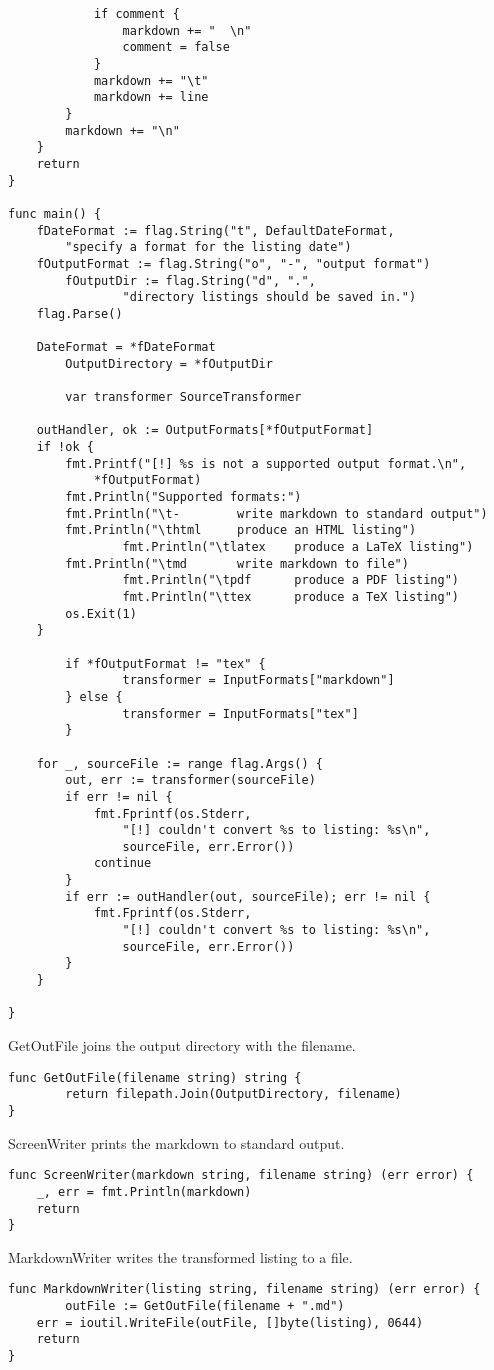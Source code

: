 \documentclass[11pt]{article}
\begin{document}
\begin{verbatim}
			if comment {
				markdown += "  \n"
				comment = false
			}
			markdown += "\t"
			markdown += line
		}
		markdown += "\n"
	}
	return
}

func main() {
	fDateFormat := flag.String("t", DefaultDateFormat,
		"specify a format for the listing date")
	fOutputFormat := flag.String("o", "-", "output format")
        fOutputDir := flag.String("d", ".",
                "directory listings should be saved in.")
	flag.Parse()

	DateFormat = *fDateFormat
        OutputDirectory = *fOutputDir

        var transformer SourceTransformer

	outHandler, ok := OutputFormats[*fOutputFormat]
	if !ok {
		fmt.Printf("[!] %s is not a supported output format.\n",
			*fOutputFormat)
		fmt.Println("Supported formats:")
		fmt.Println("\t-        write markdown to standard output")
		fmt.Println("\thtml     produce an HTML listing")
                fmt.Println("\tlatex    produce a LaTeX listing")
		fmt.Println("\tmd       write markdown to file")
                fmt.Println("\tpdf      produce a PDF listing")
                fmt.Println("\ttex      produce a TeX listing")
		os.Exit(1)
	}

        if *fOutputFormat != "tex" {
                transformer = InputFormats["markdown"]
        } else {
                transformer = InputFormats["tex"]
        }

	for _, sourceFile := range flag.Args() {
		out, err := transformer(sourceFile)
		if err != nil {
			fmt.Fprintf(os.Stderr,
				"[!] couldn't convert %s to listing: %s\n",
				sourceFile, err.Error())
			continue
		}
		if err := outHandler(out, sourceFile); err != nil {
			fmt.Fprintf(os.Stderr,
				"[!] couldn't convert %s to listing: %s\n",
				sourceFile, err.Error())
		}
	}

}

\end{verbatim}

GetOutFile joins the output directory with the filename.


\begin{verbatim}
func GetOutFile(filename string) string {
        return filepath.Join(OutputDirectory, filename)
}

\end{verbatim}

ScreenWriter prints the markdown to standard output.


\begin{verbatim}
func ScreenWriter(markdown string, filename string) (err error) {
	_, err = fmt.Println(markdown)
	return
}

\end{verbatim}

MarkdownWriter writes the transformed listing to a file.


\begin{verbatim}
func MarkdownWriter(listing string, filename string) (err error) {
        outFile := GetOutFile(filename + ".md")
	err = ioutil.WriteFile(outFile, []byte(listing), 0644)
	return
}

\end{verbatim}
\end{document}
